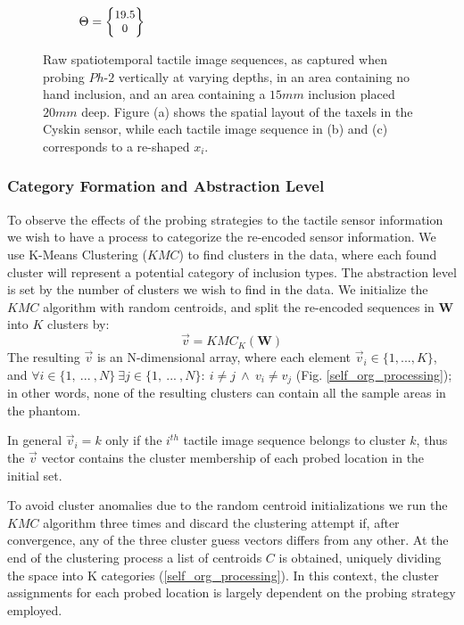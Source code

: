 \begin{figure}[]
\begin{subfigure}[b]{.38\textwidth}
		\caption{$\Theta = \small{\begin{Bmatrix}19.5\\ 0\end{Bmatrix}}$}
		\label{rawnabs:d19_5}
	\end{subfigure}
	\caption{Raw spatiotemporal tactile image sequences, as captured when probing $Ph\text{-}2$ vertically at varying depths, in an area containing no hand inclusion, and an area containing a $15mm$ inclusion placed $20mm$ deep. Figure (a) shows the spatial layout of the taxels in the Cyskin sensor, while each tactile image sequence in (b) and (c) corresponds to a re-shaped $x_i$. }
	\label{rawnabs}
\end{figure}

\subsubsection{Category Formation and Abstraction Level}\label{sec_clustering}
To observe the effects of the probing strategies to the tactile sensor information we wish to have a process to 
categorize the re-encoded sensor information. We use K-Means Clustering ($KMC$) to find clusters in the data, 
where each found cluster will represent a potential category of inclusion types. The abstraction level is set by the
number of clusters we wish to find in the data. 
We initialize the $KMC$ algorithm with random centroids, and split the re-encoded sequences in $\mathbf{W}$ into $K$ 
clusters by:
\begin{equation}
\vec{v} = KMC_{K}(\mathbf{W})
\end{equation}
The resulting $\vec{v}$ is an N-dimensional array, where each element $\vec{v}_i\in\{1, ..., K\}$, 
and $\forall i\in \{1,\ ...\ , N\}\ \exists j\in \{1,\ ...\ , N\}:\ i\neq j\ \land\ v_i\neq v_j$ 
(Fig. \ref{self_org_processing}); in other words, none of the resulting clusters can contain all the sample 
areas in the phantom. 

In general $\vec{v}_i=k$ only if the $i^{th}$ tactile image sequence belongs to cluster $k$, thus the $\vec{v}$ 
vector contains the cluster membership of each probed location in the initial set. 

To avoid cluster anomalies due to the random centroid initializations we run the $KMC$ algorithm three times 
and discard the clustering attempt if, after convergence, any of the three cluster guess vectors differs from 
any other. At the end of the clustering process a list of centroids $C$ is obtained, uniquely dividing the 
space into K categories (\ref{self_org_processing}). In this context, the cluster assignments for each probed 
location is largely dependent on the probing strategy employed. 


